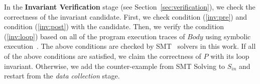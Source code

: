     In the \textbf{Invariant Verification} stage (see Section~\ref{sec:verification}),
    we check the correctness of the invariant candidate.
    First, we check condition (\ref{inv:pre}) and condition (\ref{inv:post}) with the candidate.
    Then, we verify the condition (\ref{inv:loop})
    based on all of the program execution traces of $\mathit{Body}$ using symbolic execution~\cite{}.
    The above conditions are checked by SMT~\cite{barrett2009satisfiability} solvers in this work.
    If all of the above conditions are satisfied,
    we claim the correctness of $P$ with its loop invariant.
    Otherwise, we add the counter-example from SMT Solving to $S_{\mathit{in}}$
    and restart from the \emph{data collection} stage.

%


